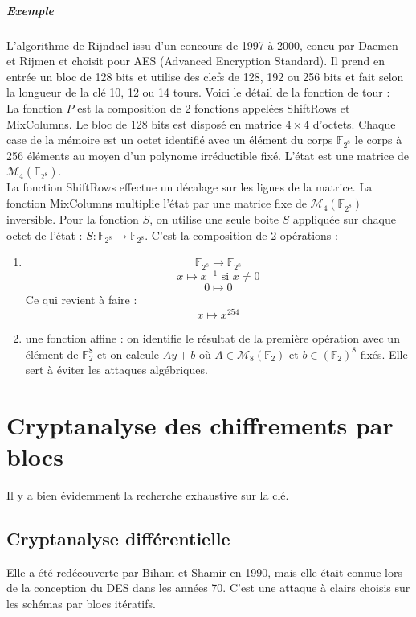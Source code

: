 \documentclass[12pt,a4paper]{report}
\begin{document}
\paragraph{Exemple \\}
L'algorithme de Rijndael issu d'un concours de 1997 à 2000, concu par Daemen et Rijmen et choisit pour AES (Advanced Encryption Standard). Il prend en entrée un bloc de 128 bits et utilise des clefs de 128, 192 ou 256 bits et fait selon la longueur de la clé 10, 12 ou 14 tours.
Voici le détail de la fonction de tour :\\
La fonction $P$ est la composition de 2 fonctions appelées ShiftRows et MixColumns. Le bloc de 128 bits est disposé en matrice $4 \times 4$ d'octets. Chaque case de la mémoire est un octet identifié avec un élément du corps $\mathbb{F}_{2^8}$ le corps à 256 éléments au moyen d'un polynome irréductible fixé. L'état est une matrice de $ \mathcal{M}_4(\mathbb{F}_{2^8})$.\\
La fonction ShiftRows effectue un décalage sur les lignes de la matrice. La fonction MixColumns multiplie l'état par une matrice fixe de  $ \mathcal{M}_4(\mathbb{F}_{2^8})$ inversible. Pour la fonction $S$, on utilise une seule boite $S$ appliquée sur chaque octet de l'état : $S : \mathbb{F}_{2^8} \rightarrow \mathbb{F}_{2^8}$. C'est la composition de 2 opérations :\\
\begin{enumerate}
\item $$ \mathbb{F}_{2^8} \rightarrow \mathbb{F}_{2^8}$$
$$ x \longmapsto x^{-1} \mbox{ si } x\neq 0$$
$$ 0 \longmapsto 0 $$
Ce qui revient à faire : $$ x \longmapsto x^{254} $$
\item une fonction affine : on identifie le résultat de la première opération avec un élément de $\mathbb{F}_2^8$ et on calcule $Ay+b$ où $A \in \mathcal{M}_{8}(\mathbb{F}_2)$ et $b \in (\mathbb{F}_2)^8$ fixés. Elle sert à éviter les attaques algébriques.
\end{enumerate}
\chapter{Cryptanalyse des chiffrements par blocs}
Il y a bien évidemment la recherche exhaustive sur la clé.
\section{Cryptanalyse différentielle}
Elle a été redécouverte par Biham et Shamir en 1990, mais elle était connue lors de la conception du DES dans les années 70. C'est une attaque à clairs choisis sur les schémas par blocs itératifs.
\end{document}
